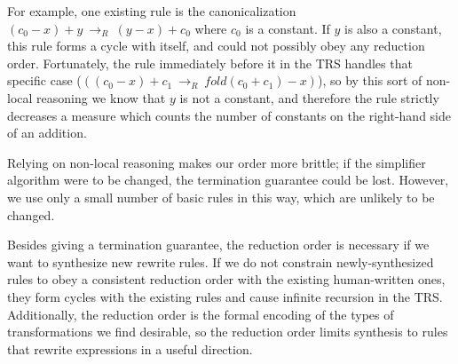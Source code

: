 \documentclass[acmsmall,review]{acmart}\settopmatter{printfolios=true,printccs=false,printacmref=false}
\newcommand{\rewrites}[0]{\:\rightarrow_{R}\:}
\begin{document}
For example, one existing rule is the canonicalization $(c_0 - x) + y \rewrites (y - x) + c_0$ where $c_0$ is a constant. If $y$ is also a constant, this rule forms a cycle with itself, and could not possibly obey any reduction order. Fortunately, the rule immediately before it in the TRS handles that specific case ($((c_0 - x) + c_1 \rewrites fold(c_0 + c_1) - x)$), so by this sort of non-local reasoning we know that $y$ is not a constant, and therefore the rule strictly decreases a measure which counts the number of constants on the right-hand side of an addition.





Relying on non-local reasoning makes our order more brittle; if the simplifier algorithm were to be changed, the termination guarantee could be lost. However, we use only a small number of basic rules in this way, which are unlikely to be changed.

Besides giving a termination guarantee, the reduction order is necessary if we want to synthesize new rewrite rules. If we do not constrain newly-synthesized rules to obey a consistent reduction order with the existing human-written ones, they form cycles with the existing rules and cause infinite recursion in the TRS. Additionally, the reduction order is the formal encoding of the types of transformations we find desirable, so the reduction order limits synthesis to rules that rewrite expressions in a useful direction.
\end{document}
